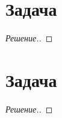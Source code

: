 \documentclass[a4paper]{article}
\theoremstyle{remark}
\begin{document}
    \section*{Задача }
	    \begin{proof}[Решение.]
		
      \end{proof}

    \section*{Задача }
	    \begin{proof}[Решение.]
		
      \end{proof}
 	
\end{document}
